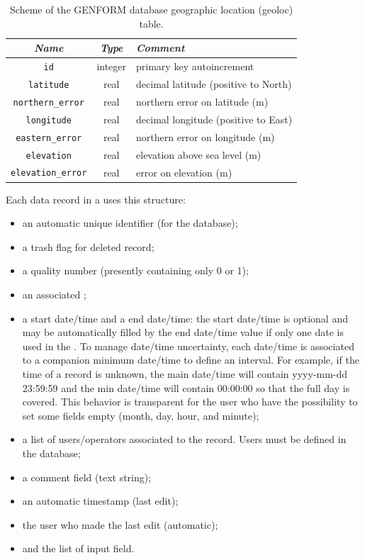 \begin{table}[h]
	\centering
	\begin{tabular}{c c l}
		\hline
		\textit{Name} & \textit{Type} & \textit{Comment} \\
		\hline
		{\tt id}              & integer  & primary key autoincrement\\
		{\tt latitude}        & real     & decimal latitude (positive to North) \\
		{\tt northern\_error}  & real     & northern error on latitude (m) \\
		{\tt longitude}       & real     & decimal longitude (positive to East) \\
		{\tt eastern\_error}   & real     & northern error on longitude (m) \\
		{\tt elevation}       & real     & elevation above sea level (m) \\
		{\tt elevation\_error} & real     & error on elevation (m) \\
		\hline
	\end{tabular}
	\caption{Scheme of the GENFORM database geographic location (geoloc) table.}
	\label{table:genform_dbgeoloc}
\end{table}


Each data record in a  uses this structure:
\begin{itemize}
	\item an automatic unique identifier (for the database);
	\item a trash flag for deleted record;
	\item a quality number (presently containing only 0 or 1);
	\item an associated ;
	\item a start date/time and a end date/time: the start date/time is optional and may be automatically filled by the end date/time value if only one date is used in the . To manage date/time uncertainty, each date/time is associated to a companion minimum date/time to define an interval. For example, if the time of a record is unknown, the main date/time will contain yyyy-mm-dd 23:59:59 and the min date/time will contain 00:00:00 so that the full day is covered. This behavior is transparent for the user who have the possibility to set some fields empty (month, day, hour, and minute);
	\item a list of users/operators associated to the record. Users must be defined in the  \webobs database;
	\item a comment field (text string);
	\item an automatic timestamp (last edit);
	\item the user who made the last edit (automatic);
	\item and the list of input field.
\end{itemize}

